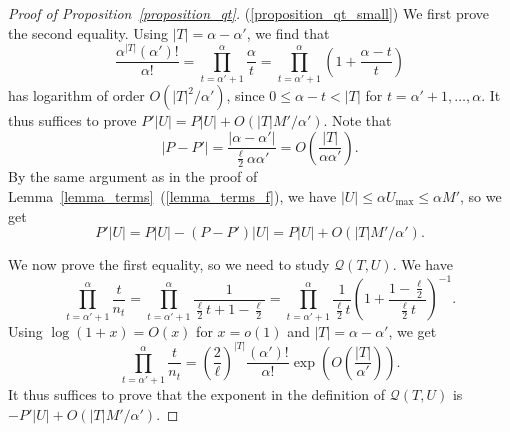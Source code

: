 \documentclass{article}
\theoremstyle{plain}
\theoremstyle{remark}
\theoremstyle{plain}
\numberwithin{equation}{section}
\begin{document}
	\begin{proof}[Proof of Proposition~\ref{proposition_qt}]
		(\ref{proposition_qt_small}) We first prove the second equality. Using $|T|=\alpha-\alpha'$, we find that $$\frac{\alpha^{|T|}(\alpha')!}{\alpha!}=\prod_{t=\alpha'+1}^{\alpha}\frac{\alpha}{t}=\prod_{t=\alpha'+1}^{\alpha}\left(1+\frac{\alpha-t}{t}\right)$$ has logarithm of order $O(|T|^2/\alpha')$, since $0\leq\alpha-t<|T|$ for $t=\alpha'+1,\ldots,\alpha$. It thus suffices to prove $P'|U|=P|U|+O(|T|M'/\alpha')$. Note that $$|P-P'|=\frac{|\alpha-\alpha'|}{\frac{\ell}{2}\alpha\alpha'}=O\left(\frac{|T|}{\alpha\alpha'}\right).$$ By the same argument as in the proof of Lemma~\ref{lemma_terms}~(\ref{lemma_terms_f}), we have $|U|\leq\alpha U_{\max}\leq\alpha M'$, so we get $$P'|U|=P|U|-(P-P')|U|=P|U|+O(|T|M'/\alpha').$$
		
		We now prove the first equality, so we need to study $\mathscr{Q}(T,U)$. We have $$\prod_{t=\alpha'+1}^{\alpha}\frac{t}{n_t}=\prod_{t=\alpha'+1}^{\alpha}\frac{1}{\frac{\ell}{2}t+1-\frac{\ell}{2}}=\prod_{t=\alpha'+1}^{\alpha}\frac{1}{\frac{\ell}{2}t}\left(1+\frac{1-\frac{\ell}{2}}{\frac{\ell}{2}t}\right)^{-1}.$$ Using $\log(1+x)=O(x)$ for $x=o(1)$ and $|T|=\alpha-\alpha'$, we get $$\prod_{t=\alpha'+1}^{\alpha}\frac{t}{n_t}=\left(\frac{2}{\ell}\right)^{|T|}\frac{(\alpha')!}{\alpha!}\exp\left(O\left(\frac{|T|}{\alpha'}\right)\right).$$ It thus suffices to prove that the exponent in the definition of $\mathscr{Q}(T,U)$ is $-P'|U|+O(|T|M'/\alpha')$.
		

\end{proof}
\end{document}
